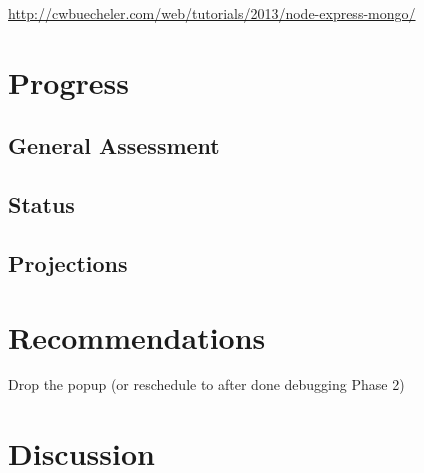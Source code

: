 \documentclass[11pt]{article}
\begin{document}
\url{http://cwbuecheler.com/web/tutorials/2013/node-express-mongo/}

\section{Progress}

\subsection{General Assessment}
\subsection{Status}
\subsection{Projections}

\section{Recommendations}

Drop the popup (or reschedule to after done debugging Phase 2)

\section{Discussion}
\end{document}
